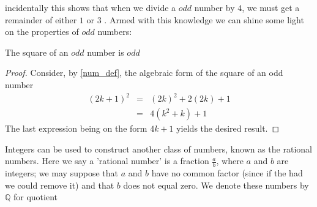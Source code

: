 incidentally this shows that when we divide a $odd$ number by $4$, we must get a remainder of either $1$ or
$3$ \label{remainder}. Armed with this knowledge we can shine some light on the properties of $odd$ numbers:
\begin{cor}
The square of an $odd$ number is $odd$
\end{cor}
\begin{proof}
Consider, by \ref{num_def}, the algebraic form of the square of an odd number
\[\begin{array} {lcl} 
(2k+1)^2 & = & (2k)^2 + 2(2k) + 1 \\ 
                 & = & 4(k^2 + k) + 1 
\end{array}\]
The last expression being on the form $4k + 1$ yields the desired result. 
\end{proof}

Integers can be used to construct another class of numbers, known as the rational numbers. Here we say a 'rational
number' is a fraction $\frac{a}{b}$, where $a$ and $b$ are integers; we may suppose that $a$ and $b$ have no common
factor (since if the had we could remove it) and that $b$ does not equal zero. We denote these numbers by $\mathbb{Q}$
for quotient

